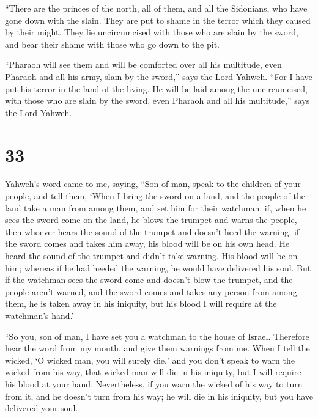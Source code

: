  ``There are the princes of the north, all of them, and
all the Sidonians, who have gone down with the slain. They are put to
shame in the terror which they caused by their might. They lie
uncircumcised with those who are slain by the sword, and bear their
shame with those who go down to the pit.

 ``Pharaoh will see them and will be comforted over all
his multitude, even Pharaoh and all his army, slain by the sword,'' says
the Lord Yahweh.  ``For I have put his terror in the land
of the living. He will be laid among the uncircumcised, with those who
are slain by the sword, even Pharaoh and all his multitude,'' says the
Lord Yahweh.

\hypertarget{section-32}{%
\section{33}\label{section-32}}

 Yahweh's word came to me, saying,  ``Son of
man, speak to the children of your people, and tell them, `When I bring
the sword on a land, and the people of the land take a man from among
them, and set him for their watchman,  if, when he sees
the sword come on the land, he blows the trumpet and warns the people,
 then whoever hears the sound of the trumpet and doesn't
heed the warning, if the sword comes and takes him away, his blood will
be on his own head.  He heard the sound of the trumpet and
didn't take warning. His blood will be on him; whereas if he had heeded
the warning, he would have delivered his soul.  But if the
watchman sees the sword come and doesn't blow the trumpet, and the
people aren't warned, and the sword comes and takes any person from
among them, he is taken away in his iniquity, but his blood I will
require at the watchman's hand.'

 ``So you, son of man, I have set you a watchman to the
house of Israel. Therefore hear the word from my mouth, and give them
warnings from me.  When I tell the wicked, `O wicked man,
you will surely die,' and you don't speak to warn the wicked from his
way, that wicked man will die in his iniquity, but I will require his
blood at your hand.  Nevertheless, if you warn the wicked
of his way to turn from it, and he doesn't turn from his way; he will
die in his iniquity, but you have delivered your soul.

